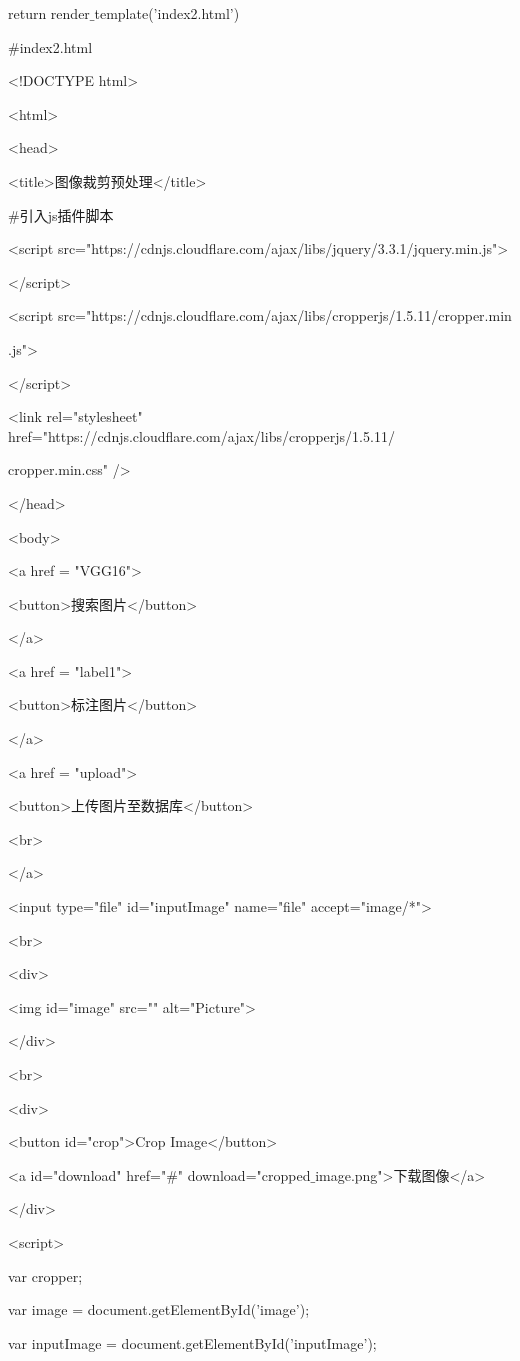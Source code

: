 \documentclass[bachelor_p]{hdu-thesis}
\begin{document}
\qquad return render$\_$template('index2.html')

$\#$index2.html

<!DOCTYPE html>

<html>

<head>

<title>图像裁剪预处理</title>

$\#$引入js插件脚本

<script src="https://cdnjs.cloudflare.com/ajax/libs/jquery/3.3.1/jquery.min.js">

</script>

<script src="https://cdnjs.cloudflare.com/ajax/libs/cropperjs/1.5.11/cropper.min

.js">

</script>

<link rel="stylesheet" href="https://cdnjs.cloudflare.com/ajax/libs/cropperjs/1.5.11/

cropper.min.css" />

</head>

<body>

<a href = "VGG16">

<button>搜索图片</button>

</a>

<a href = "label1">

<button>标注图片</button>

</a>

<a href = "upload">

<button>上传图片至数据库</button>

<br>

</a>

<input type="file" id="inputImage" name="file" accept="image/*">

<br>

<div>

<img id="image" src="" alt="Picture">

</div>

<br>

<div>

<button id="crop">Crop Image</button>

<a id="download" href="$\#$" download="cropped$\_$image.png">下载图像</a>

</div>

<script>

var cropper;

var image = document.getElementById('image');

var inputImage = document.getElementById('inputImage');
\end{document}

